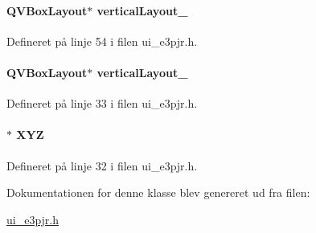 \paragraph[{\texorpdfstring{vertical\+Layout\+\_\+8}{verticalLayout_8}}]{\setlength{\rightskip}{0pt plus 5cm}Q\+V\+Box\+Layout$\ast$ vertical\+Layout\+\_}\hypertarget{class_ui___e3_p_j_r_aecbd2cafbe12abcd4a5a7865aad8d917}{}\label{class_ui___e3_p_j_r_aecbd2cafbe12abcd4a5a7865aad8d917}


Defineret på linje 54 i filen ui\+\_\+e3pjr.\+h.

\paragraph[{\texorpdfstring{vertical\+Layout\+\_\+9}{verticalLayout_9}}]{\setlength{\rightskip}{0pt plus 5cm}Q\+V\+Box\+Layout$\ast$ vertical\+Layout\+\_}\hypertarget{class_ui___e3_p_j_r_a7c00a0b53a83fa0709131b996a6249a9}{}\label{class_ui___e3_p_j_r_a7c00a0b53a83fa0709131b996a6249a9}


Defineret på linje 33 i filen ui\+\_\+e3pjr.\+h.

\paragraph[{\texorpdfstring{X\+YZ}{XYZ}}]{$\ast$ X\+YZ}\hypertarget{class_ui___e3_p_j_r_a098a80b873d9e0a09fd834f09e5028b4}{}\label{class_ui___e3_p_j_r_a098a80b873d9e0a09fd834f09e5028b4}


Defineret på linje 32 i filen ui\+\_\+e3pjr.\+h.



Dokumentationen for denne klasse blev genereret ud fra filen\+:\begin{DoxyCompactItemize}
\item 
\hyperlink{ui__e3pjr_8h}{ui\+\_\+e3pjr.\+h}\end{DoxyCompactItemize}
